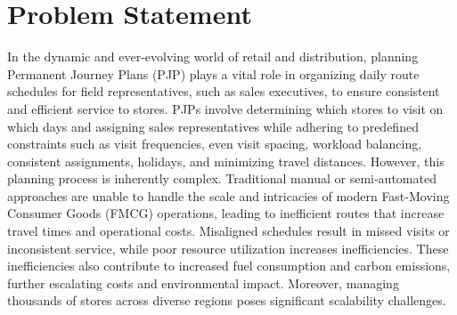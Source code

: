 


\section{Problem Statement}



In the dynamic and ever-evolving world of retail and distribution, planning Permanent Journey Plans (PJP) plays a vital role in organizing daily route schedules for field representatives, such as sales executives, to ensure consistent and efficient service to stores. PJPs involve determining which stores to visit on which days and assigning sales representatives while adhering to predefined constraints such as visit frequencies, even visit spacing, workload balancing, consistent assignments, holidays, and minimizing travel distances.
However, this planning process is inherently complex. Traditional manual or semi-automated approaches are unable to handle the scale and intricacies of modern Fast-Moving Consumer Goods (FMCG) operations, leading to inefficient routes that increase travel times and operational costs. Misaligned schedules result in missed visits or inconsistent service, while poor resource utilization increases inefficiencies. These inefficiencies also contribute to increased fuel consumption and carbon emissions, further escalating costs and environmental impact. Moreover, managing thousands of stores across diverse regions poses significant scalability challenges.


